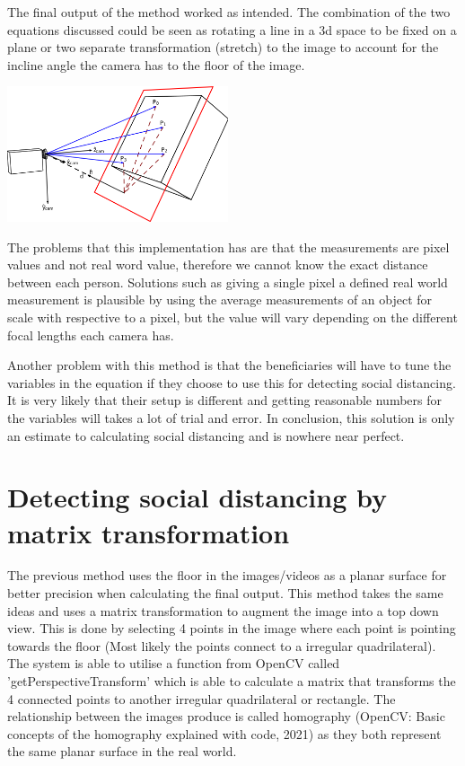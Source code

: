 \documentclass[12pt]{report}
\begin{document}
The final output of the method worked as intended. The combination of the two equations discussed could be seen as rotating a line in a 3d space to be fixed on a plane or two separate transformation (stretch) to the image to account for the incline angle the camera has to the floor of the image.

\begin{center}
	\includegraphics[width=65mm]{./images/appendix/qwe.JPG}
\end{center}

The problems that this implementation has are that the measurements are pixel values and not real word value, therefore we cannot know the exact distance between each person. Solutions such as giving a single pixel a defined real world measurement is plausible by using the average measurements of an object for scale with respective to a pixel, but the value will vary depending on the different focal lengths each camera has.

\vspace{2mm}

Another problem with this method is that the beneficiaries will have to tune the variables in the equation if they choose to use this for detecting social distancing. It is very likely that their setup is different and getting reasonable numbers for the variables will takes a lot of trial and error. 
In conclusion, this solution is only an estimate to calculating social distancing and is nowhere near perfect. 

\section{Detecting social distancing by matrix transformation}

The previous method uses the floor in the images/videos as a planar surface for better precision when calculating the final output. This method takes the same ideas and uses a matrix transformation to augment the image into a top down view. This is done by selecting 4 points in the image where each point is pointing towards the floor (Most likely the points connect to a irregular quadrilateral). The system is able to utilise a function from OpenCV called 'getPerspectiveTransform' which is able to calculate a matrix that transforms the 4  connected points to another irregular quadrilateral or rectangle. The relationship between the images produce is called homography (OpenCV: Basic concepts of the homography explained with code, 2021) as they both represent the same planar surface in the real world.
\end{document}
